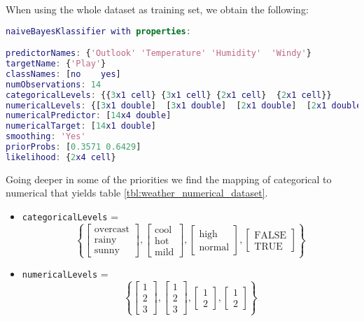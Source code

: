 When using the whole dataset as training set, we obtain the following:
\begin{lstlisting}[language=MATLAB]
naiveBayesKlassifier with properties:

predictorNames: {'Outlook' 'Temperature' 'Humidity'  'Windy'}
targetName: {'Play'}
classNames: [no    yes]
numObservations: 14
categoricalLevels: {{3x1 cell} {3x1 cell} {2x1 cell}  {2x1 cell}}
numericalLevels: {[3x1 double]  [3x1 double]  [2x1 double]  [2x1 double]}
numericalPredictor: [14x4 double]
numericalTarget: [14x1 double]
smoothing: 'Yes'
priorProbs: [0.3571 0.6429]
likelihood: {2x4 cell}
\end{lstlisting}

Going deeper in some of the priorities we find the mapping of categorical to numerical that yields table \ref{tbl:weather_numerical_dataset}.
\begin{itemize}
	\item \texttt{categoricalLevels} =
	\begin{equation*}
	\left\lbrace 
	\begin{bmatrix} \text{overcast} \\ \text{rainy} \\ \text{sunny} \end{bmatrix},
	\begin{bmatrix} \text{cool} \\ \text{hot} \\ \text{mild} \end{bmatrix},
	\begin{bmatrix} \text{high} \\ \text{normal} \end{bmatrix},
	\begin{bmatrix} \text{FALSE} \\ \text{TRUE} \end{bmatrix} 
	\right\rbrace 
	\end{equation*} 
	\item \texttt{numericalLevels} =
	\begin{equation*}
	\left\lbrace 
	\begin{bmatrix} 1 \\ 2 \\ 3 \end{bmatrix},
	\begin{bmatrix} 1 \\ 2 \\ 3 \end{bmatrix},
	\begin{bmatrix} 1 \\ 2 \end{bmatrix},
	\begin{bmatrix} 1 \\ 2 \end{bmatrix}
	\right\rbrace 
	\end{equation*} 
\end{itemize}

